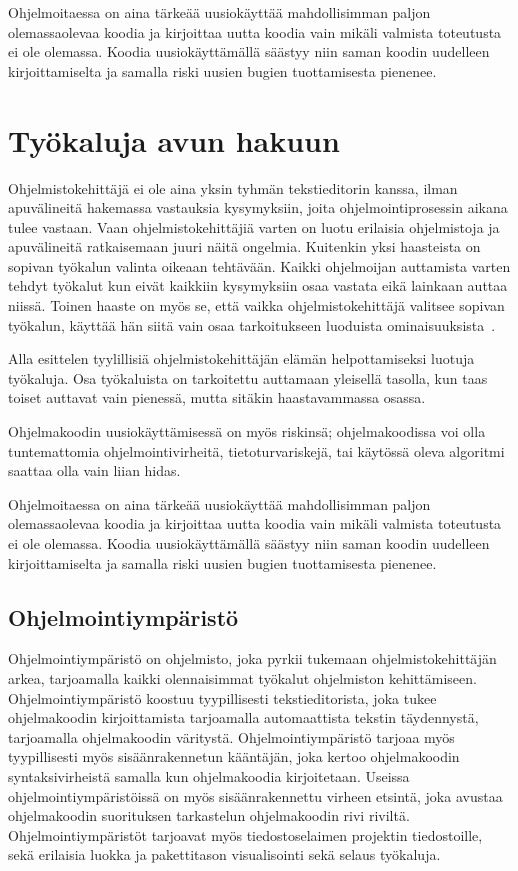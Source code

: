 \documentclass[finnish]{../tktltiki2}
\theoremstyle{definition}
\theoremstyle{remark}
\begin{document}
Ohjelmoitaessa on aina tärkeää uusiokäyttää mahdollisimman paljon olemassaolevaa koodia ja kirjoittaa uutta koodia vain mikäli valmista toteutusta ei ole olemassa. Koodia uusiokäyttämällä säästyy niin saman koodin uudelleen kirjoittamiselta ja samalla riski uusien bugien tuottamisesta pienenee.

\section{Työkaluja avun hakuun}
Ohjelmistokehittäjä ei ole aina yksin tyhmän tekstieditorin kanssa, ilman apuvälineitä hakemassa vastauksia kysymyksiin, joita ohjelmointiprosessin aikana tulee vastaan. Vaan ohjelmistokehittäjiä varten on luotu erilaisia ohjelmistoja ja apuvälineitä ratkaisemaan juuri näitä ongelmia.
Kuitenkin yksi haasteista on sopivan työkalun valinta oikeaan tehtävään. Kaikki ohjelmoijan auttamista varten tehdyt työkalut kun eivät kaikkiin kysymyksiin osaa vastata eikä lainkaan auttaa niissä. Toinen haaste on myös se, että vaikka ohjelmistokehittäjä valitsee sopivan työkalun, käyttää hän siitä vain osaa tarkoitukseen luoduista ominaisuuksista~\cite{whyline}.

Alla esittelen tyylillisiä ohjelmistokehittäjän elämän helpottamiseksi luotuja työkaluja. Osa työkaluista on tarkoitettu auttamaan yleisellä tasolla, kun taas toiset auttavat vain pienessä, mutta sitäkin haastavammassa osassa.

Ohjelmakoodin uusiokäyttämisessä on myös riskinsä; ohjelmakoodissa voi olla tuntemattomia ohjelmointivirheitä, tietoturvariskejä, tai käytössä oleva algoritmi saattaa olla vain liian hidas.

Ohjelmoitaessa on aina tärkeää uusiokäyttää mahdollisimman paljon olemassaolevaa koodia ja kirjoittaa uutta koodia vain mikäli valmista toteutusta ei ole olemassa. Koodia uusiokäyttämällä säästyy niin saman koodin uudelleen kirjoittamiselta ja samalla riski uusien bugien tuottamisesta pienenee.


\subsection{Ohjelmointiympäristö}
Ohjelmointiympäristö on ohjelmisto, joka pyrkii tukemaan ohjelmistokehittäjän arkea, tarjoamalla kaikki olennaisimmat työkalut ohjelmiston kehittämiseen. Ohjelmointiympäristö koostuu tyypillisesti tekstieditorista, joka tukee ohjelmakoodin kirjoittamista tarjoamalla automaattista tekstin täydennystä, tarjoamalla ohjelmakoodin väritystä. Ohjelmointiympäristö tarjoaa myös tyypillisesti myös sisäänrakennetun kääntäjän, joka kertoo ohjelmakoodin syntaksivirheistä samalla kun ohjelmakoodia kirjoitetaan. Useissa ohjelmointiympäristöissä on myös sisäänrakennettu virheen etsintä, joka avustaa ohjelmakoodin suorituksen tarkastelun ohjelmakoodin rivi riviltä. Ohjelmointiympäristöt tarjoavat myös tiedostoselaimen projektin tiedostoille, sekä erilaisia luokka ja pakettitason visualisointi sekä selaus työkaluja.
\end{document}
